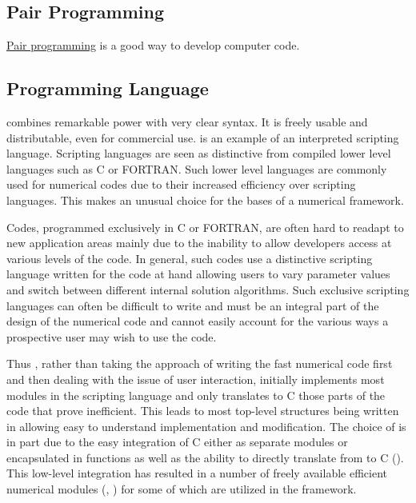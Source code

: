 \subsection{Pair Programming}

\href{http://www.extremeprogramming.org/rules/pair.html}{Pair programming}
is a good way to develop computer code.

\subsection{\Python{} Programming Language}

\Python{} combines remarkable power with very clear syntax. It is
freely usable and distributable, even for commercial use. \Python{} is
an example of an interpreted scripting language. Scripting languages
are seen as distinctive from compiled lower level languages such as C
or FORTRAN. Such lower level languages are commonly used for numerical
codes due to their increased efficiency over scripting languages. This
makes \Python{} an unusual choice for the bases of a numerical
framework.

Codes, programmed exclusively in C or FORTRAN, are often hard to
readapt to new application areas mainly due to the inability to allow
developers access at various levels of the code. In general, such
codes use a distinctive scripting language written for the code at
hand allowing users to vary parameter values and switch between
different internal solution algorithms. Such exclusive scripting
languages can often be difficult to write and must be an integral part
of the design of the numerical code and cannot easily account for the
various ways a prospective user may wish to use the code.

Thus \FiPy{}, rather than taking the approach of writing the fast
numerical code first and then dealing with the issue of user
interaction, initially implements most modules in the \Python{}
scripting language and only translates to C those parts of the code
that prove inefficient. This leads to most top-level structures being
written in \Python{} allowing easy to understand implementation and
modification. The choice of \Python{} is in part due to the easy
integration of C either as separate modules or encapsulated in
\Python{} functions as well as the ability to directly translate from
\Python{} to C (\PyRex{}). This low-level integration has resulted
in a number of freely available efficient numerical modules (\SciPy{},
\Numeric{}) for \Python{} some of which are utilized in the \FiPy{}
framework.

